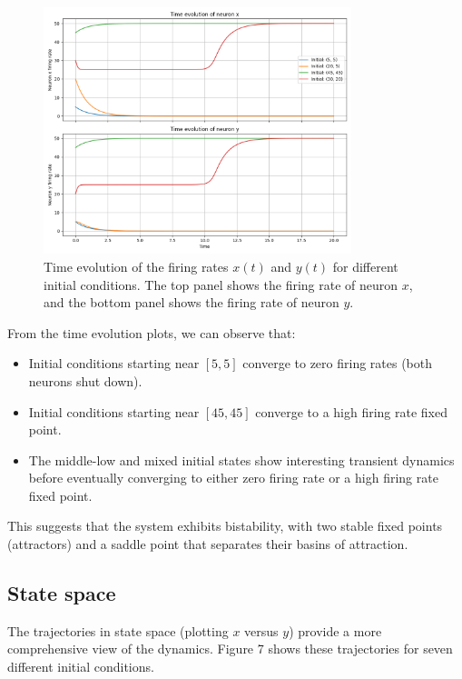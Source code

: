 \documentclass{article}
\begin{document}
\begin{figure}[H]
    \centering
    \includegraphics[width=0.8\textwidth]{dynamics2_plot.png}
    \caption{Time evolution of the firing rates $x(t)$ and $y(t)$ for different initial conditions. The top panel shows the firing rate of neuron $x$, and the bottom panel shows the firing rate of neuron $y$.}
    \label{fig:dynamics}
\end{figure}

From the time evolution plots, we can observe that:
\begin{itemize}
    \item Initial conditions starting near $[5, 5]$ converge to zero firing rates (both neurons shut down).
    \item Initial conditions starting near $[45, 45]$ converge to a high firing rate fixed point.
    \item The middle-low and mixed initial states show interesting transient dynamics before eventually converging to either zero firing rate or a high firing rate fixed point.
\end{itemize}

This suggests that the system exhibits bistability, with two stable fixed points (attractors) and a saddle point that separates their basins of attraction.

\subsection{State space}


The trajectories in state space (plotting $x$ versus $y$) provide a more comprehensive view of the dynamics. Figure 7 shows these trajectories for seven different initial conditions.
\end{document}
